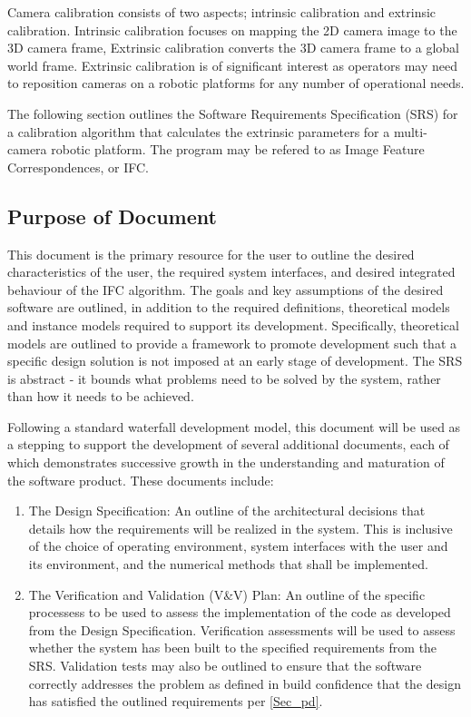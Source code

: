 \documentclass[12pt]{article}
\begin{document}
Camera calibration consists of two aspects; intrinsic calibration and extrinsic 
calibration. Intrinsic calibration focuses on mapping the 2D camera image 
to the 3D camera frame, Extrinsic calibration converts the 3D camera frame
to a global world frame. Extrinsic calibration is of significant interest as  
operators may need to reposition cameras on a robotic platforms for any number of 
operational needs.

The following section outlines the Software Requirements Specification (SRS) for 
a calibration algorithm that calculates the extrinsic parameters for a multi-camera 
robotic platform. The program may be refered to as Image Feature Correspondences, 
or IFC.


\subsection{Purpose of Document}

This document is the primary resource for the user to outline the desired 
characteristics of the user, the required system interfaces, and desired 
integrated behaviour of the IFC algorithm. The goals and key assumptions of the
desired software are outlined, in addition to the required definitions, 
theoretical models and instance models required to support its development. 
Specifically, theoretical models are outlined to provide a framework to promote 
development such that a specific design solution is not imposed at an early stage 
of development. The SRS is abstract - it bounds what problems need to be solved by 
the system, rather than how it needs to be achieved.

Following a standard waterfall development model, this document will be used as a 
stepping to support the development of several additional documents, each of which 
demonstrates successive growth in the understanding and maturation of the software 
product. These documents include:
\begin{enumerate}
  \item The Design Specification: An outline of the architectural decisions that 
  details   how the requirements will be realized in the system. This is inclusive 
  of the choice of operating environment, system interfaces with the user and its 
  environment, and the   numerical methods that shall be implemented.

  \item The Verification and Validation (V\&V) Plan: An outline of the specific processess 
  to be used to assess the implementation of the code as developed from the Design 
  Specification. Verification assessments will be used to assess whether the system has been 
  built to the specified requirements from the SRS. Validation tests may also be outlined to 
  ensure that the software correctly addresses the problem as defined in  build confidence 
  that the   design has satisfied the outlined requirements per \ref{Sec_pd}.
\end{enumerate}
\end{document}

